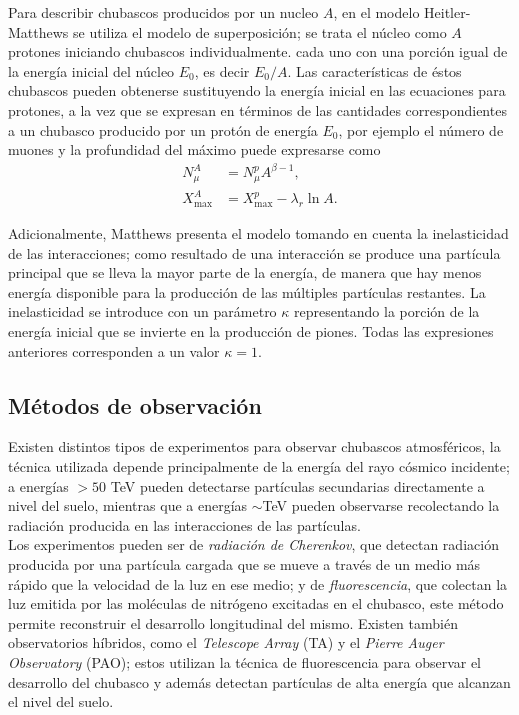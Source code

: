 	Para describir chubascos producidos por un nucleo $A$, en el modelo Heitler-Matthews se utiliza el modelo de superposición; se trata el núcleo como $A$ protones iniciando chubascos individualmente. cada uno con una porción igual de la energía inicial del núcleo $E_0$, es decir $E_0/A$. Las características de éstos chubascos pueden obtenerse sustituyendo la energía inicial en las ecuaciones para protones, a la vez que se expresan en términos de las cantidades correspondientes a un chubasco producido por un protón de energía $E_0$, por ejemplo el número de muones y la profundidad del máximo puede expresarse como
	\begin{align}
	N_{\mu}^{A}		  	&= N_{\mu}^{p} A^{\beta -1}, \\ 
	X_{\text{max}}^{A} 	&= X_{\text{max}}^{p} - \lambda_r \ln A.
	\end{align}

	Adicionalmente, Matthews presenta el modelo tomando en cuenta la inelasticidad de las interacciones; como resultado de una interacción se produce una partícula principal que se lleva la mayor parte de la energía, de manera que hay menos energía disponible para la producción de las múltiples partículas restantes. La inelasticidad se introduce con un parámetro $\kappa$ representando la porción de la energía inicial que se invierte en la producción de piones. Todas las expresiones anteriores corresponden a un valor $\kappa = 1$.

	
	\subsection{Métodos de observación}
	Existen distintos tipos de experimentos para observar chubascos atmosféricos, la técnica utilizada depende principalmente de la energía del rayo cósmico incidente; a energías $>50$ TeV pueden detectarse partículas secundarias directamente a nivel del suelo, mientras que a energías $\sim$TeV pueden observarse recolectando la radiación producida en las interacciones de las partículas. \\
	
	Los experimentos pueden ser de \textit{radiación de Cherenkov}, que detectan radiación producida por una partícula cargada que se mueve a través de un medio más rápido que la velocidad de la luz en ese medio; y de \textit{fluorescencia}, que colectan la luz emitida por las moléculas de nitrógeno excitadas en el chubasco, este método permite reconstruir el desarrollo longitudinal del mismo. Existen también observatorios híbridos, como el \textit{Telescope Array} (TA) y el \textit{Pierre Auger Observatory} (PAO); estos utilizan la técnica de fluorescencia para observar el desarrollo del chubasco y además detectan partículas de alta energía que alcanzan el nivel del suelo.
	
